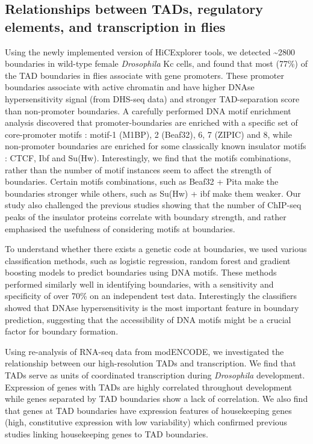 \documentclass[11pt,twoside]{MPIthesis}
\theoremstyle{definition}
\theoremstyle{definition}
\theoremstyle{definition}
\theoremstyle{remark}
\begin{document}
\subsection{Relationships between TADs, regulatory elements, and
transcription in
flies}\label{relationships-between-tads-regulatory-elements-and-transcription-in-flies}

Using the newly implemented version of HiCExplorer tools, we detected
\textasciitilde{}2800 boundaries in wild-type female \emph{Drosophila}
Kc cells, and found that most (77\%) of the TAD boundaries in flies
associate with gene promoters. These promoter boundaries associate with
active chromatin and have higher DNAse hypersensitivity signal (from
DHS-seq data) and stronger TAD-separation score than non-promoter
boundaries. A carefully performed DNA motif enrichment analysis
discovered that promoter-boundaries are enriched with a specific set of
core-promoter motifs : motif-1 (M1BP), 2 (Beaf32), 6, 7 (ZIPIC) and 8,
while non-promoter boundaries are enriched for some classically known
insulator motifs : CTCF, Ibf and Su(Hw). Interestingly, we find that the
motifs combinations, rather than the number of motif instances seem to
affect the strength of boundaries. Certain motifs combinations, such as
Beaf32 + Pita make the boundaries stronger while others, such as Su(Hw)
+ ibf make them weaker. Our study also challenged the previous studies
showing that the number of ChIP-seq peaks of the insulator proteins
correlate with boundary strength, and rather emphasised the usefulness
of considering motifs at boundaries.

To understand whether there exists a genetic code at boundaries, we used
various classification methods, such as logistic regression, random
forest and gradient boosting models to predict boundaries using DNA
motifs. These methods performed similarly well in identifying
boundaries, with a sensitivity and specificity of over 70\% on an
independent test data. Interestingly the classifiers showed that DNAse
hypersensitivity is the most important feature in boundary prediction,
suggesting that the accessibility of DNA motifs might be a crucial
factor for boundary formation.

Using re-analysis of RNA-seq data from modENCODE, we investigated the
relationship between our high-resolution TADs and transcription. We find
that TADs serve as units of coordinated transcription during
\emph{Drosophila} development. Expression of genes with TADs are highly
correlated throughout development while genes separated by TAD
boundaries show a lack of correlation. We also find that genes at TAD
boundaries have expression features of housekeeping genes (high,
constitutive expression with low variability) which confirmed previous
studies linking housekeeping genes to TAD boundaries.
\end{document}
